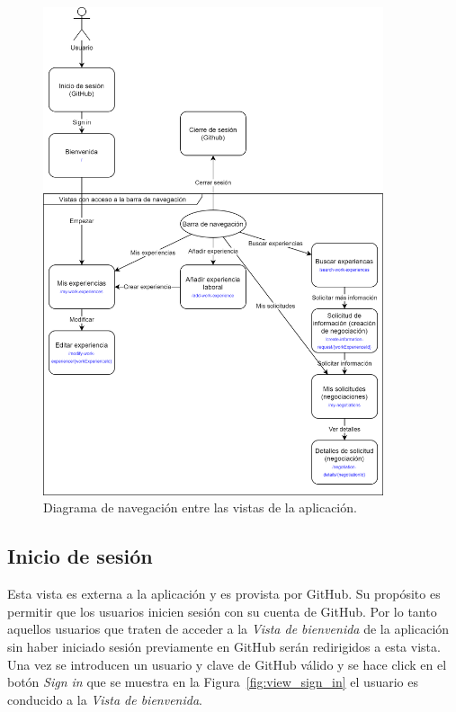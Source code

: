 \documentclass[a4paper, 12pt]{book}
\begin{document}
    \begin{figure}
        \centering
        \includegraphics[width=10cm, keepaspectratio]{img/Navegacion.png}
        \caption{Diagrama de navegación entre las vistas de la aplicación.}\label{fig:navegation_diagram}
    \end{figure}

    \subsection{Inicio de sesión}
    \label{subsec:view_sign_in}
    Esta vista es externa a la aplicación y es provista por GitHub.
    Su propósito es permitir que los usuarios inicien sesión con su cuenta de GitHub.
    Por lo tanto aquellos usuarios que traten de acceder a la \emph{Vista de bienvenida} de la aplicación sin haber iniciado sesión previamente en GitHub serán redirigidos a esta vista.
    Una vez se introducen un usuario y clave de GitHub válido y se hace click en el botón \emph{Sign in} que se muestra en la Figura~\ref{fig:view_sign_in} el usuario es conducido a la \emph{Vista de bienvenida}.
\end{document}
